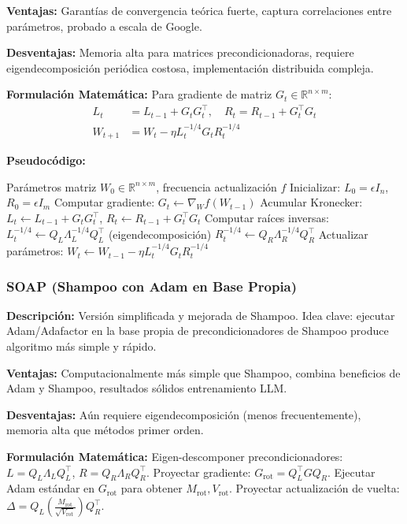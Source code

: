 \documentclass[11pt,a4paper]{article}
\begin{document}
\textbf{Ventajas:} Garantías de convergencia teórica fuerte, captura correlaciones entre parámetros, probado a escala de Google.

\textbf{Desventajas:} Memoria alta para matrices precondicionadoras, requiere eigendecomposición periódica costosa, implementación distribuida compleja.

\textbf{Formulación Matemática:} Para gradiente de matriz $G_t \in \mathbb{R}^{n \times m}$:
\begin{align}
L_t &= L_{t-1} + G_t G_t^\top, \quad R_t = R_{t-1} + G_t^\top G_t \\
W_{t+1} &= W_t - \eta L_t^{-1/4} G_t R_t^{-1/4}
\end{align}

\textbf{Pseudocódigo:}
\begin{algorithm}
\caption{Shampoo --- Preacondicionamiento Kronecker Factorizado}
\begin{algorithmic}[1]
\Require Parámetros matriz $W_0 \in \mathbb{R}^{n \times m}$, frecuencia actualización $f$
\State Inicializar: $L_0 = \epsilon I_n$, $R_0 = \epsilon I_m$
\State Computar gradiente: $G_t \gets \nabla_W f(W_{t-1})$
\State Acumular Kronecker: $L_t \gets L_{t-1} + G_t G_t^\top$, $R_t \gets R_{t-1} + G_t^\top G_t$
\State Computar raíces inversas: 
\State \quad $L_t^{-1/4} \gets Q_L \Lambda_L^{-1/4} Q_L^\top$ (eigendecomposición)
\State \quad $R_t^{-1/4} \gets Q_R \Lambda_R^{-1/4} Q_R^\top$
\EndIf
\State Actualizar parámetros: $W_t \gets W_{t-1} - \eta L_t^{-1/4} G_t R_t^{-1/4}$
\EndFor
\end{algorithmic}
\end{algorithm}

\subsubsection{SOAP (Shampoo con Adam en Base Propia)}

\textbf{Descripción:} Versión simplificada y mejorada de Shampoo. Idea clave: ejecutar Adam/Adafactor en la base propia de precondicionadores de Shampoo produce algoritmo más simple y rápido.

\textbf{Ventajas:} Computacionalmente más simple que Shampoo, combina beneficios de Adam y Shampoo, resultados sólidos entrenamiento LLM.

\textbf{Desventajas:} Aún requiere eigendecomposición (menos frecuentemente), memoria alta que métodos primer orden.

\textbf{Formulación Matemática:} Eigen-descomponer precondicionadores: $L = Q_L \Lambda_L Q_L^\top$, $R = Q_R \Lambda_R Q_R^\top$. Proyectar gradiente: $G_{\text{rot}} = Q_L^\top G Q_R$. Ejecutar Adam estándar en $G_{\text{rot}}$ para obtener $M_{\text{rot}}, V_{\text{rot}}$. Proyectar actualización de vuelta: $\Delta = Q_L \left(\frac{M_{\text{rot}}}{\sqrt{V_{\text{rot}}}}\right) Q_R^\top$.
\end{document}
